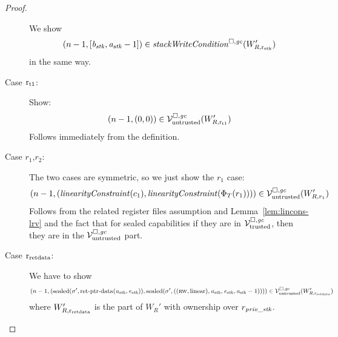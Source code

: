 \begin{proof}
\begin{description}
    We show
    \[
      \npair[n-1]{[\baddr_\stk,\aaddr_\stk-1]} \in \stackWriteCond{W_{R,\rstk}'}
    \]
    in the same way.

  \item[Case $\rtmp{1}$:] Show:
    \[
      \npair[n-1]{(0,0)} \in \lrv(W_{R,\rtmp{1}}')
    \]
    Follows immediately from the definition.

  \item[Case $r_1$,$r_2$:] The two cases are symmetric, so we just show the $r_1$ case:
    \[
      \npair[n-1]{(\linCons{c_1},\linCons{\Phi_T(r_1)})} \in \lrv(W_{R,r_1}')
    \]
    Follows from the related register files assumption and Lemma~\ref{lem:lincons-lrv} and the fact that for sealed capabilities if they are in $\lrvg{\trusted}$, then they are in the $\lrv$ part.

  \item[Case $\rretd$:] We have to show
    \[
      \npair[n-1]{(\sealed{\sigma',\retptrd(\aaddr_\stk,\eaddr_\stk)},\sealed{\sigma',((\rw,\linear),\aaddr_\stk,\eaddr_\stk,\aaddr_\stk-1)})} \in \lrv(W_{R,\rretd}')
    \]
    where $W_{R,\rretd}'$ is the part of $W_R'$ with ownership over $r_\var{priv\_stk}$.


\end{description}
\end{proof}
